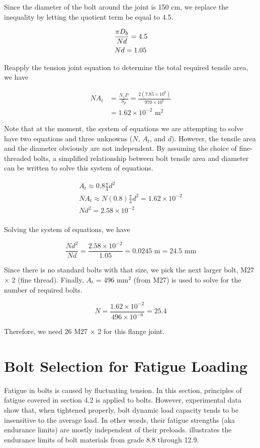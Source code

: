 \documentclass[a4paper,openany,12pt]{book}
\begin{document}
{{Since the diameter of the bolt around the joint is 150 cm, we replace
the inequality by letting the quotient term be equal to 4.5.

$$\begin{gathered}
  \frac{\pi D_b}{Nd} = 4.5 \hfill \\
  Nd = 1.05 \hfill \\ 
\end{gathered}$$

Reapply the tension joint equation to determine the total required
tensile area, we have

$$\begin{aligned}
  NA_t &= \frac{N_sP}{S_p} = \frac{2(7.85 \times 10^6)}{970 \times 10^6} \\
         &= 1.62 \times 10^{-2} \text{ m}^2\end{aligned}$$

Note that at the moment, the system of equations we are attempting to
solve have two equations and three unknowns (\(N\), \(A_t\), and \(d\)).
However, the tensile area and the diameter obviously are not
independent. By assuming the choice of fine-threaded bolts, a simplified
relationship between bolt tensile area and diameter can be written to
solve this system of equations.

$$\begin{gathered}
  A_t \approx 0.8\frac{\pi }{4}d^2 \\ 
  NA_t \approx N(0.8)\frac{\pi}{4}d^2 = 1.62 \times 10^{-2} \\ 
  Nd^2 = 2.58 \times 10^{-2} \\ 
\end{gathered}$$

Solving the system of equations, we have

$$\frac{Nd^2}{Nd} = \frac{2.58 \times 10^{-2}}{1.05} = 0.0245 \text{ m} = 24.5 \text{ mm}$$

Since there is no standard bolts with that size, we pick the next larger
bolt, M27 \(\times\) 2 (fine thread). Finally, \(A_t\) = 496 mm\(^2\) (from
M27) is used to solve for the number of required bolts.

$$N = \frac{1.62 \times 10^{-2}}{496 \times 10^{-6}} = 25.4$$

Therefore, we need 26 M27 \(\times\) 2 for this flange joint.

\section{Bolt Selection for Fatigue Loading}
\label{bolt-selection-for-fatigue-loading}
Fatigue in bolts is caused by fluctuating tension. In this section,
principles of fatigue covered in section 4.2 is applied to bolts.
However, experimental data show that, when tightened properly, bolt
dynamic load capacity tends to be insensitive to the average load. In
other words, their fatigue strengths (aka endurance limits) are mostly
independent of their preloads. illustrates the endurance limits of bolt
materials from grade 8.8 through 12.9.


}}
\end{document}
